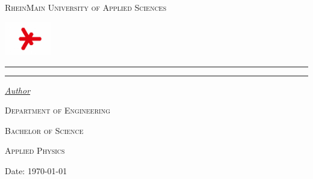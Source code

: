 \begin{titlepage}
	\newcommand{\HRule}{\rule{\linewidth}{0.5mm}}
	\centering
	\textsc{\Large RheinMain University of Applied Sciences} \par

	\begin{center}
		\includegraphics[width=0.15\textwidth]{logo-hsrm.jpg}
	\end{center}
	\textsc{\LARGE \titleLV}\vspace{0.5cm}
		\HRule\vspace{0.4cm}
	{\huge\bfseries \subtitleA}\par\vspace{0.4cm} %
	{\huge\bfseries \subtitleB}\par\vspace{0.4cm} %
		\HRule\vspace{1.5cm}
	\begin{minipage}{0.4\textwidth}
		\large
		\textit{\underline{Author}}\par\vspace{0.5cm}
		\textsc{\nameA}\par\vspace{0.5cm}
	\end{minipage}
	\vfill\vfill\vfill
	\textsc{\Large Department of Engineering}\par\vspace{0.5cm}\par
	\textsc{\large Bachelor of Science}\par\vspace{0.5cm}
	\textsc{\large Applied Physics}\par\vspace{0.5cm}
	\vfill
	\begin{flushleft}
		Date:\hspace{0.4cm} {\large\today}
	\end{flushleft}
\end{titlepage}